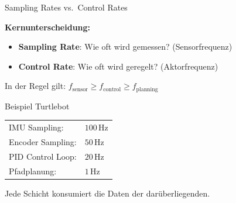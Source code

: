 \documentclass[%
  aspectratio=169,
  10pt
]{beamer}
\newcommand{\SI}[2]{#1\,\text{#2}}
\newcommand{\hl}[1]{{\color{fbblau}\textbf{#1}}}
\begin{document}
\begin{frame}{Sampling Rates vs.\ Control Rates}

\textbf{Kernunterscheidung:}
\begin{itemize}
  \item \hl{Sampling Rate}: Wie oft wird gemessen? (Sensorfrequenz)
  \item \hl{Control Rate}: Wie oft wird geregelt? (Aktorfrequenz)
\end{itemize}

\vspace{3mm}
In der Regel gilt:
$f_\mathrm{sensor} \ge f_\mathrm{control} \ge f_\mathrm{planning}$

\vspace{3mm}
\begin{exampleblock}{Beispiel Turtlebot}
  \begin{tabular}{ll}
    IMU Sampling:        & $\SI{100}{Hz}$ \\
    Encoder Sampling:    & $\SI{50}{Hz}$ \\
    PID Control Loop:    & $\SI{20}{Hz}$ \\
    Pfadplanung:         & $\SI{1}{Hz}$ \\
  \end{tabular}

  \vspace{1mm}
  Jede Schicht konsumiert die Daten der darüberliegenden.
\end{exampleblock}

\end{frame}
\end{document}
